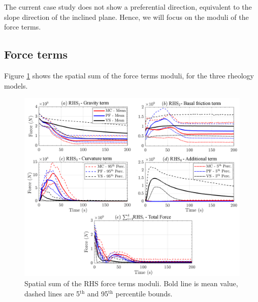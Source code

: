 \documentclass{article}
\begin{document}
The current case study does not show a preferential direction, equivalent to the slope direction of the inclined plane. Hence, we will focus on the moduli of the force terms.
\subsection{Force terms}
Figure \ref{fig:Colima-F-spatial} shows the spatial sum of the force terms moduli, for the three rheology models.
\begin{figure}[H]
        \centering
        \includegraphics[width=1\textwidth]{BAF_VolcanDeColima/AveragedMeasurments/ForcesColima.png}
        \caption{Spatial sum of the RHS force terms moduli. Bold line is mean value, dashed lines are 5$^{\mathrm{th}}$ and 95$^{\mathrm{th}}$ percentile bounds.}
        \label{fig:Colima-F-spatial}
\end{figure}
\end{document}

